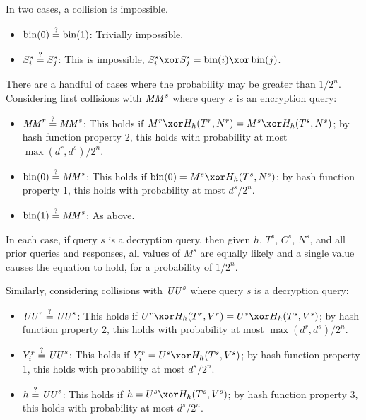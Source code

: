 \documentclass[hctr.tex]{subfiles}
\begin{document}
In two cases, a collision is impossible.

\begin{itemize}
    \item \(\operatorname{bin}(0) \stackrel{\text{?}}{=} \operatorname{bin}(1)\): 
    Trivially impossible.
    \item 
    \(S_i^s \stackrel{\text{?}}{=} S_j^s\):
    This is impossible, 
    \(S_i^s \xor S_j^s = \fromint(i) \xor \fromint(j)\).
\end{itemize}

There are a handful of cases where the probability may
be greater than \(1/2^n\).
Considering first collisions with \(\mathit{MM}^s\) where
query \(s\) is an encryption query:

\begin{itemize}
    \item \(\mathit{MM}^r \stackrel{\text{?}}{=} \mathit{MM}^s\):
    This holds if \(M^r \xor H_h(T^r, N^r) = M^s \xor H_h(T^s, N^s)\);
    by hash function property 2, this holds with probability at most
    \(\max(d^r, d^s)/2^n\).
    \item \(\operatorname{bin}(0) \stackrel{\text{?}}{=} \mathit{MM}^s\):
    This holds if \(\fromint(0) = M^s \xor H_h(T^s, N^s)\);
    by hash function property 1, this holds with probability at most
    \(d^s/2^n\).
    \item \(\operatorname{bin}(1) \stackrel{\text{?}}{=} \mathit{MM}^s\):
    As above.
\end{itemize}

In each case, if query \(s\) is a decryption query,
then given \(h\), \(T^s\), \(C^s\), \(N^s\),
and all prior queries and responses,
all values of \(M^s\) are equally likely 
and a single value causes the equation to hold,
for a probability of \(1/2^n\).

Similarly, considering collisions with \(\mathit{UU}^s\) where
query \(s\) is a decryption query:

\begin{itemize}
    \item \(\mathit{UU}^r \stackrel{\text{?}}{=} \mathit{UU}^s\): 
    This holds if \(U^r \xor H_h(T^r, V^r) = U^s \xor H_h(T^s, V^s)\);
    by hash function property 2, this holds with probability at most
    \(\max(d^r, d^s)/2^n\).
    \item \(Y_i^r \stackrel{\text{?}}{=} \mathit{UU}^s\):
    This holds if \(Y_i^r = U^s \xor H_h(T^s, V^s)\);
    by hash function property 1, this holds with probability at most
    \(d^s/2^n\).
    \item \(h \stackrel{\text{?}}{=} \mathit{UU}^s\):
    This holds if \(h = U^s \xor H_h(T^s, V^s)\);
    by hash function property 3, this holds with probability at most
    \(d^s/2^n\).
\end{itemize}
\end{document}
